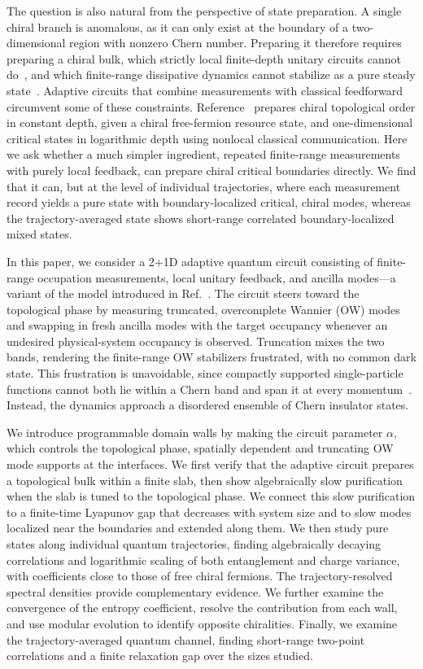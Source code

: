 \documentclass[aps,prb,10pt,twocolumn,superscriptaddress,longbibliography,floatfix]{revtex4-2}
\begin{document}
The question is also natural from the perspective of state preparation. A single chiral branch is anomalous, as it can only exist at the boundary of a two-dimensional region with nonzero Chern number. Preparing it therefore requires preparing a chiral bulk, which strictly local finite-depth unitary circuits cannot do~\cite{LuLessaKimHsieh2022}, and which finite-range dissipative dynamics cannot stabilize as a pure steady state~\cite{BardynEtAl2013,BudichZollerDiehl2015,Goldstein2019}. Adaptive circuits that combine measurements with classical feedforward circumvent some of these constraints. Reference~\cite{LuLessaKimHsieh2022} prepares chiral topological order in constant depth, given a chiral free-fermion resource state, and one-dimensional critical states in logarithmic depth using nonlocal classical communication. Here we ask whether a much simpler ingredient, repeated finite-range measurements with purely local feedback, can prepare chiral critical boundaries directly. We find that it can, but at the level of individual trajectories, where each measurement record yields a pure state with boundary-localized critical, chiral modes, whereas the trajectory-averaged state shows short-range correlated boundary-localized mixed states.

In this paper, we consider a 2+1D adaptive quantum circuit consisting of finite-range occupation measurements, local unitary feedback, and ancilla modes---a variant of the model introduced in Ref.~\cite{BhuiyanPanJian2026}. The circuit steers toward the topological phase by measuring truncated, overcomplete Wannier (OW) modes and swapping in fresh ancilla modes with the target occupancy whenever an undesired physical-system occupancy is observed. Truncation mixes the two bands, rendering the finite-range OW stabilizers frustrated, with no common dark state. This frustration is unavoidable, since compactly supported single-particle functions cannot both lie within a Chern band and span it at every momentum~\cite{DubailRead2015}. Instead, the dynamics approach a disordered ensemble of Chern insulator states.

We introduce programmable domain walls by making the circuit parameter $\alpha$, which controls the topological phase, spatially dependent and truncating OW mode supports at the interfaces. We first verify that the adaptive circuit prepares a topological bulk within a finite slab, then show algebraically slow purification when the slab is tuned to the topological phase. We connect this slow purification to a finite-time Lyapunov gap that decreases with system size and to slow modes localized near the boundaries and extended along them. We then study pure states along individual quantum trajectories, finding algebraically decaying correlations and logarithmic scaling of both entanglement and charge variance, with coefficients close to those of free chiral fermions. The trajectory-resolved spectral densities provide complementary evidence. We further examine the convergence of the entropy coefficient, resolve the contribution from each wall, and use modular evolution to identify opposite chiralities. Finally, we examine the trajectory-averaged quantum channel, finding short-range two-point correlations and a finite relaxation gap over the sizes studied.
\end{document}
